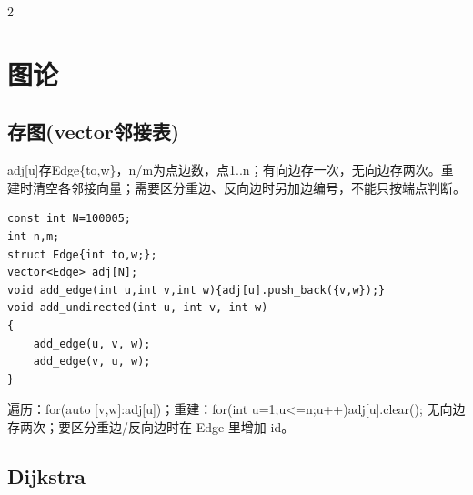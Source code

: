 \documentclass[UTF8,fontset=fandol,a4paper,twoside]{ctexart}
\newcommand{\note}[1]{{\fontsize{10}{12}\selectfont #1\par}}
\begin{document}
\begin{multicols}{2}
\section{图论}
\subsection{存图(vector邻接表)}

\note{adj[\allowbreak{}u]\allowbreak{}存Edge\{to,\allowbreak{}w\}，n/\allowbreak{}m为点边数，点1.\allowbreak{}.\allowbreak{}n；有向边存一次，无向边存两次。重建时清空各邻接向量；需要区分重边、反向边时另加边编号，不能只按端点判断。}
\begin{lstlisting}
const int N=100005;
int n,m;
struct Edge{int to,w;};
vector<Edge> adj[N];
void add_edge(int u,int v,int w){adj[u].push_back({v,w});}
void add_undirected(int u, int v, int w)
{
    add_edge(u, v, w);
    add_edge(v, u, w);
}
\end{lstlisting}
\note{遍历：for(\allowbreak{}auto [\allowbreak{}v,\allowbreak{}w]\allowbreak{}:adj[\allowbreak{}u]\allowbreak{})\allowbreak{}；重建：for(\allowbreak{}int u=\allowbreak{}1;u<\allowbreak{}=\allowbreak{}n;u+\allowbreak{}+\allowbreak{})\allowbreak{}adj[\allowbreak{}u]\allowbreak{}.\allowbreak{}clear(\allowbreak{})\allowbreak{}; 无向边存两次；要区分重边/\allowbreak{}反向边时在 Edge 里增加 id。}
\subsection{Dijkstra}


\end{multicols}
\end{document}
